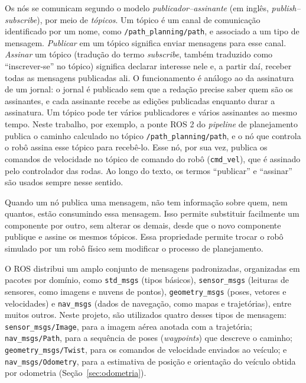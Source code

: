 \documentclass[
    12pt,
    openright,
    oneside,
    a4paper,
    english,
    brazil
]{abntex2}
\begin{document}
Os nós se comunicam segundo o modelo \emph{publicador--assinante} (em inglês, \textit{publish--subscribe}), por meio de \emph{tópicos}. Um tópico é um canal de comunicação identificado por um nome, como \texttt{/\allowbreak{}path\_\allowbreak{}planning/\allowbreak{}path}, e associado a um tipo de mensagem. \emph{Publicar} em um tópico significa enviar mensagens para esse canal. \emph{Assinar} um tópico (tradução do termo \textit{subscribe}, também traduzido como ``inscrever-se'' no tópico) significa declarar interesse nele e, a partir daí, receber todas as mensagens publicadas ali. O funcionamento é análogo ao da assinatura de um jornal: o jornal é publicado sem que a redação precise saber quem são os assinantes, e cada assinante recebe as edições publicadas enquanto durar a assinatura. Um tópico pode ter vários publicadores e vários assinantes ao mesmo tempo. Neste trabalho, por exemplo, a ponte ROS 2 do \textit{pipeline} de planejamento publica o caminho calculado no tópico \texttt{/\allowbreak{}path\_\allowbreak{}planning/\allowbreak{}path}, e o nó que controla o robô assina esse tópico para recebê-lo. Esse nó, por sua vez, publica os comandos de velocidade no tópico de comando do robô (\texttt{cmd\_\allowbreak{}vel}), que é assinado pelo controlador das rodas. Ao longo do texto, os termos ``publicar'' e ``assinar'' são usados sempre nesse sentido.

Quando um nó publica uma mensagem, não tem informação sobre quem, nem quantos, estão consumindo essa mensagem. Isso permite substituir facilmente um componente por outro, sem alterar os demais, desde que o novo componente publique e assine os mesmos tópicos. Essa propriedade permite trocar o robô simulado por um robô físico sem modificar o processo de planejamento.

O ROS distribui um amplo conjunto de mensagens padronizadas, organizadas em pacotes por domínio, como \texttt{std\_\allowbreak{}msgs} (tipos básicos), \texttt{sensor\_\allowbreak{}msgs} (leituras de sensores, como imagens e nuvens de pontos), \texttt{geometry\_\allowbreak{}msgs} (poses, vetores e velocidades) e \texttt{nav\_\allowbreak{}msgs} (dados de navegação, como mapas e trajetórias), entre muitos outros. Neste projeto, são utilizados quatro desses tipos de mensagem: \texttt{sensor\_\allowbreak{}msgs/\allowbreak{}Image}, para a imagem aérea anotada com a trajetória; \texttt{nav\_\allowbreak{}msgs/\allowbreak{}Path}, para a sequência de poses (\textit{waypoints}) que descreve o caminho; \texttt{geometry\_\allowbreak{}msgs/\allowbreak{}Twist}, para os comandos de velocidade enviados ao veículo; e \texttt{nav\_\allowbreak{}msgs/\allowbreak{}Odometry}, para a estimativa de posição e orientação do veículo obtida por odometria (Seção~\ref{sec:odometria}).
\end{document}
